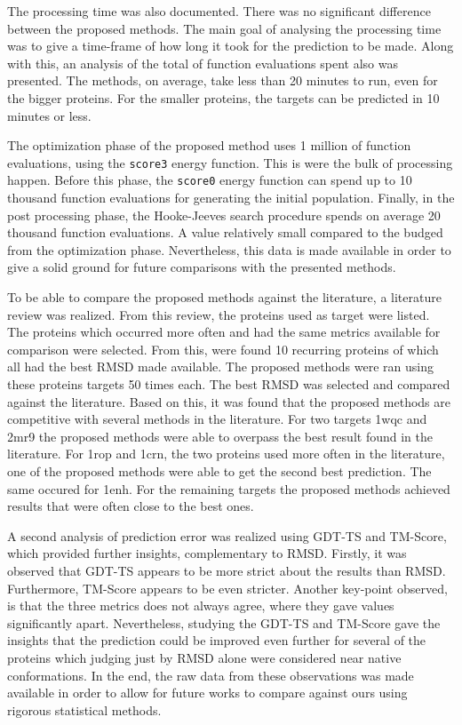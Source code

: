 The processing time was also documented. There was no significant difference
between the proposed methods. The main goal of analysing the processing time was
to give a time-frame of how long it took for the prediction to be made. Along
with this, an analysis of the total of function evaluations spent also was
presented. The methods, on average, take less than 20 minutes to run, even for
the bigger proteins. For the smaller proteins, the targets can be predicted in
10 minutes or less.

The optimization phase of the proposed method uses 1 million of function
evaluations, using the \texttt{score3} energy function. This is were the bulk
of processing happen. Before this phase, the \texttt{score0} energy function
can spend up to 10 thousand function evaluations for generating the initial
population. Finally, in the post processing phase, the Hooke-Jeeves search
procedure spends on average 20 thousand function evaluations. A value relatively
small compared to the budged from the optimization phase. Nevertheless, this
data is made available in order to give a solid ground for future comparisons
with the presented methods.

To be able to compare the proposed methods against the literature, a literature
review was realized. From this review, the proteins used as target were listed.
The proteins which occurred more often and had the same metrics available for
comparison were selected. From this, were found 10 recurring proteins of which
all had the best RMSD made available. The proposed methods were ran using these
proteins targets 50 times each. The best RMSD was selected and compared against
the literature. Based on this, it was found that the proposed methods are
competitive with several methods in the literature. For two targets 1wqc and
2mr9 the proposed methods were able to overpass the best result found in the
literature. For 1rop and 1crn, the two proteins used more often in the
literature, one of the proposed methods were able to get the second best
prediction. The same occured for 1enh. For the remaining targets the proposed
methods achieved results that were often close to the best ones.

A second analysis of prediction error was realized using GDT-TS and TM-Score,
which provided further insights, complementary to RMSD. Firstly, it was observed
that GDT-TS appears to be more strict about the results than RMSD. Furthermore,
TM-Score appears to be even stricter. Another key-point observed, is that the
three metrics does not always agree, where they gave values significantly
apart. Nevertheless, studying the GDT-TS and TM-Score gave the insights that
the prediction could be improved even further for several of the proteins which
judging just by RMSD alone were considered near native conformations. In the end,
the raw data from these observations was made available in order to allow for
future works to compare against ours using rigorous statistical methods.

